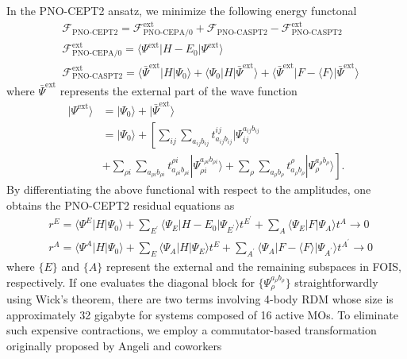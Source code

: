 \documentclass[aip,jcp,amsmath]{revtex4-1}
\begin{document}
%
In the PNO-CEPT2 ansatz, we minimize the following energy functonal
%
\begin{align}
  &\mathscr{F}_\text{PNO-CEPT2} = \mathscr{F}_\text{PNO-CEPA/0}^\text{ext}+\mathscr{F}_\text{PNO-CASPT2}-\mathscr{F}_\text{PNO-CASPT2}^\text{ext} \label{eq:F-CEPT2} \\
  &\mathscr{F}_\text{PNO-CEPA/0}^\text{ext} = \langle\Psi^\text{ext}|H-E_0|\Psi^\text{ext}\rangle \label{eq:F-CEPA/0} \\
  &\mathscr{F}_\text{PNO-CASPT2}^\text{ext} = \langle\bar{\Psi}^\text{ext}|H|\Psi_0\rangle + \langle\Psi_0|H|\bar{\Psi}^\text{ext}\rangle+\langle\bar{\Psi}^\text{ext}|F-\langle F\rangle|\bar{\Psi}^\text{ext}\rangle \label{eq:F-CASPT2}
\end{align}
%
where $\bar{\Psi}^\text{ext}$ represents the external part of the wave function
%
\begin{align}
  |\Psi^\text{ext}\rangle&=|\Psi_0\rangle+|\bar{\Psi}^\text{ext}\rangle \nonumber \\
  &=|\Psi_0\rangle+\left[\sum_{ij}\sum_{a_{ij}b_{ij}} t_{a_{ij}b_{ij}}^{ij}|\Psi^{a_{ij}b_{ij}}_{ij} \right. \nonumber \\
    &+ \left.\sum_{\rho i}\sum_{a_{\rho i}b_{\rho i}} t_{a_{\rho i}b_{\rho i}}^{\rho i}|\Psi^{a_{\rho i}b_{\rho i}}_{\rho i}\rangle + \sum_{\rho}\sum_{a_{\rho}b_{\rho}} t_{a_{\rho}b_{\rho}}^{\rho}|\Psi^{a_{\rho}b_{\rho}}_{\rho}\rangle\right].
\end{align}
%
By differentiating the above functional with respect to the amplitudes, one obtains the PNO-CEPT2 residual equations as
%
\begin{align}
  &r^{E}=\langle\Psi^{E}|H|\Psi_0\rangle+\sum_{E^{'}}\langle\Psi_E|H-E_0|\Psi_{E^{'}}\rangle t^{E^{'}}+\sum_{A}\langle\Psi_E|F|\Psi_A\rangle t^A \rightarrow 0 \label{eq:CEPT-E} \\
  &r^{A}=\langle\Psi^{A}|H|\Psi_0\rangle+\sum_{E}\langle\Psi_A|H|\Psi_E\rangle t^E+\sum_{A^{'}}\langle\Psi_A|F-\langle F\rangle|\Psi_{A^{'}}\rangle t^{A^{'}} \rightarrow 0 \label{eq:CEPT-A}
\end{align}
%
where $\{E\}$ and $\{A\}$ represent the external and the remaining subspaces in FOIS, respectively.
%
If one evaluates the diagonal block for $\{\Psi_{\rho}^{a_{\rho}b_{\rho}}\}$ straightforwardly using Wick's theorem, there are two terms involving 4-body RDM whose size is approximately 32 gigabyte for systems composed of 16 active MOs.
%
To eliminate such expensive contractions, we employ a commutator-based transformation originally proposed by Angeli and coworkers\cite{angeliintroduction2001,angelin-electron2002,angelinew2006}
\end{document}
